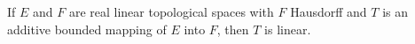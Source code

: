If $E$ and $F$ are real linear topological spaces with $F$ Hausdorff and $T$ is an additive bounded mapping of $E$ into $F$, then $T$ is linear.
